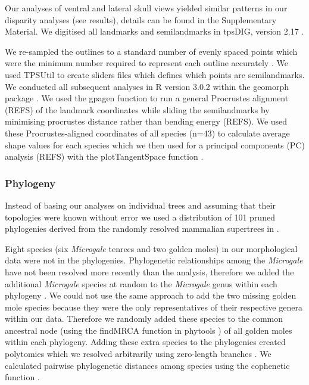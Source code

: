 \documentclass[12pt,a4paper]{article}
\begin{document}
Our analyses of ventral and lateral skull views yielded similar patterns in our disparity analyses (see results), details can be found in the Supplementary Material. We digitised all landmarks and semilandmarks in tpsDIG, version 2.17 \citep{Rohlf2013}.



We re-sampled the outlines to a standard number of evenly spaced points which were the minimum number required to represent each outline accurately \citep[][details in Supplementary Material]{MacLeod2013}. We used TPSUtil \citep{Rohlf2012} to create sliders files \citep{Zelditch2012} which defines which points are semilandmarks. We conducted all subsequent analyses in R version 3.0.2 \citep[R Development Core][]{Team2013} within the geomorph package \citep{Adams2013}. We used the gpagen function to run a general Procrustes alignment (REFS) of the landmark coordinates while sliding the semilandmarks by minimising procrustes distance rather than bending energy (REFS). We used these Procrustes-aligned coordinates of all species (n=43) to calculate average shape values for each species which we then used for a principal components (PC) analysis (REFS) with the plotTangentSpace function \citep{Adams2013}. 


\subsubsection{Phylogeny} 
Instead of basing our analyses on individual trees and assuming that their topologies were known without error 
\citep[e.g.][]{Ruta2013, Foth2012, Brusatte2008, Harmon2003} we used a distribution of 101 pruned phylogenies derived from the randomly resolved mammalian supertrees in \citep{Kuhn2011}. 

Eight species (six \textit{Microgale} tenrecs and two golden moles) in our morphological data were not in the phylogenies. Phylogenetic relationships among the \textit{Microgale} have not been resolved more recently than the \citep{Kuhn2011} analysis, therefore we added the additional \textit{Microgale} species at random to the \textit{Microgale} genus within each phylogeny \citep{Revell2012}. We could not use the same approach to add the two missing golden mole species because they were the only representatives of their respective genera within our data. Therefore we randomly added these species to the common ancestral node (using the findMRCA function in phytools \citep{Revell2012}) of all golden moles within each phylogeny. Adding these extra species to the phylogenies created polytomies which we resolved arbitrarily using zero-length branches \citep{Paradis2004}. We calculated pairwise phylogenetic distances among species using the cophenetic function \citep[R Development Core][]{Team2013}. 
	
\end{document}

